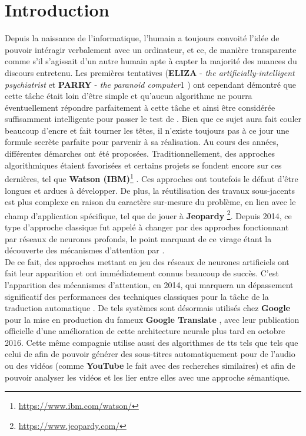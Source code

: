 \section{Introduction}

Depuis la naissance de l'informatique, l'humain a toujours convoité l'idée de pouvoir intéragir verbalement avec un ordinateur, et ce, de manière transparente comme s'il s'agissait d'un autre humain apte à capter la majorité des nuances du discours entretenu. Les premières tentatives (\textbf{ELIZA} - \textit{the artificially-intelligent psychiatrist} \cite{elizaWeizenbaum} et   \textbf{PARRY} - \textit{the paranoid computer}1 \cite{parryCerf}) ont cependant démontré que cette tâche était loin d'être simple et qu'aucun algorithme ne pourra éventuellement répondre parfaitement à cette tâche et ainsi être considérée suffisamment intelligente pour passer le test de \cite{turingTest}. Bien que ce sujet aura fait couler beaucoup d'encre et fait tourner les têtes, il n'existe toujours pas à ce jour une formule secrète parfaite pour parvenir à sa réalisation. Au cours des années, différentes démarches ont été proposées. Traditionnellement, des approches algorithmiques étaient favorisées et certains projets se fondent encore sur ces dernières, tel que \textbf{Watson (IBM)}\footnote{\url{https://www.ibm.com/watson/}} \cite{ibmWatson}. Ces approches ont toutefois le défaut d'être longues et ardues à développer. De plus, la réutilisation des travaux sous-jacents est plus complexe en raison du caractère sur-mesure du problème, en lien avec le champ d'application spécifique, tel que de jouer à \textbf{Jeopardy} \footnote{\url{https://www.jeopardy.com/}}. Depuis 2014, ce type d'approche classique fut appelé à changer par des approches fonctionnant par réseaux de neurones profonds, le point marquant de ce virage étant la découverte des mécanismes d'attention par \cite{attentionMechanism}. \\

De ce fait, des approches mettant en jeu des réseaux de neurones artificiels ont fait leur apparition et ont immédiatement connus beaucoup de succès. C'est l'apparition des mécanismes d'attention, en 2014, qui marquera un dépassement significatif des performances des techniques classiques pour la tâche de la traduction automatique \cite{attentionMechanism}. De tels systèmes sont désormais utilisés chez \textbf{Google} pour la mise en production du fameux \textbf{Google Translate} \cite{googleTranslate}, avec leur publication officielle d'une amélioration de cette architecture neurale plus tard en octobre 2016. Cette même compagnie utilise aussi des algorithmes de \gls{tts} tels que tels que celui de \cite{acousticModeling} afin de pouvoir générer des sous-titres automatiquement pour de l'audio ou des vidéos (comme \textbf{YouTube} le fait avec des recherches similaires) et afin de pouvoir analyser les vidéos et les lier entre elles avec une approche sémantique. \\


